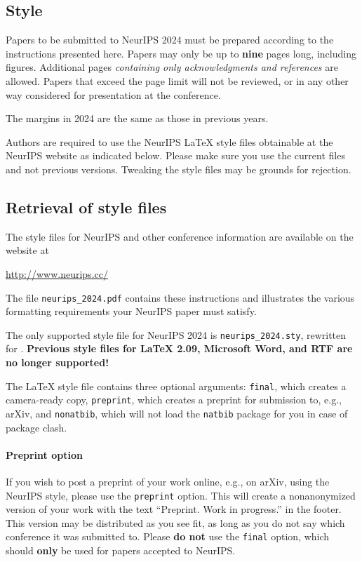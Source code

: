 \documentclass{article}
\begin{document}
\subsection{Style}


Papers to be submitted to NeurIPS 2024 must be prepared according to the
instructions presented here. Papers may only be up to {\bf nine} pages long,
including figures. Additional pages \emph{containing only acknowledgments and
references} are allowed. Papers that exceed the page limit will not be
reviewed, or in any other way considered for presentation at the conference.


The margins in 2024 are the same as those in previous years.


Authors are required to use the NeurIPS \LaTeX{} style files obtainable at the
NeurIPS website as indicated below. Please make sure you use the current files
and not previous versions. Tweaking the style files may be grounds for
rejection.


\subsection{Retrieval of style files}


The style files for NeurIPS and other conference information are available on
the website at
\begin{center}
  \url{http://www.neurips.cc/}
\end{center}
The file \verb+neurips_2024.pdf+ contains these instructions and illustrates the
various formatting requirements your NeurIPS paper must satisfy.


The only supported style file for NeurIPS 2024 is \verb+neurips_2024.sty+,
rewritten for \LaTeXe{}.  \textbf{Previous style files for \LaTeX{} 2.09,
  Microsoft Word, and RTF are no longer supported!}


The \LaTeX{} style file contains three optional arguments: \verb+final+, which
creates a camera-ready copy, \verb+preprint+, which creates a preprint for
submission to, e.g., arXiv, and \verb+nonatbib+, which will not load the
\verb+natbib+ package for you in case of package clash.


\paragraph{Preprint option}


If you wish to post a preprint of your work online, e.g., on arXiv, using the
NeurIPS style, please use the \verb+preprint+ option. This will create a
nonanonymized version of your work with the text ``Preprint. Work in progress.''
in the footer. This version may be distributed as you see fit, as long as you do not say which conference it was submitted to. Please \textbf{do
  not} use the \verb+final+ option, which should \textbf{only} be used for
papers accepted to NeurIPS.
\end{document}
